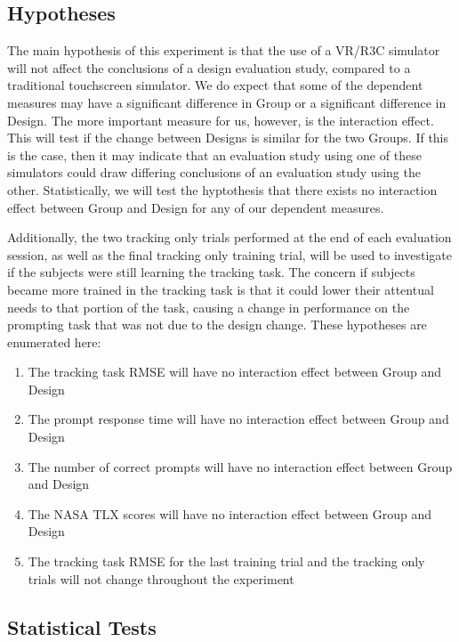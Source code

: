 \subsection{Hypotheses}

The main hypothesis of this experiment is that the use of a VR/R3C simulator will not affect the conclusions of a design evaluation study, compared to a traditional touchscreen simulator.
We do expect that some of the dependent measures may have a significant difference in Group or a significant difference in Design.
The more important measure for us, however, is the interaction effect.
This will test if the change between Designs is similar for the two Groups.
If this is the case, then it may indicate that an evaluation study using one of these simulators could draw differing conclusions of an evaluation study using the other.
Statistically, we will test the hyptothesis that there exists no interaction effect between Group and Design for any of our dependent measures.

Additionally, the two tracking only trials performed at the end of each evaluation session, as well as the final tracking only training trial, will be used to investigate if the subjects were still learning the tracking task.
The concern if subjects became more trained in the tracking task is that it could lower their attentual needs to that portion of the task, causing a change in performance on the prompting task that was not due to the design change.
These hypotheses are enumerated here:

\begin{enumerate}[label={H\arabic*.}]
    \item The tracking task RMSE will have no interaction effect between Group and Design
    \item The prompt response time will have no interaction effect between Group and Design
    \item The number of correct prompts will have no interaction effect between Group and Design
    \item The NASA TLX scores will have no interaction effect between Group and Design
    \item The tracking task RMSE for the last training trial and the tracking only trials will not change throughout the experiment
\end{enumerate}

\subsection{Statistical Tests}

